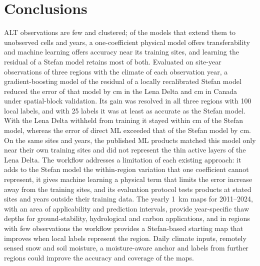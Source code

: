\section{Conclusions}\label{sec:conclusions}
ALT observations are few and clustered; of the models that extend them to unobserved cells and years, a one-coefficient physical model offers transferability and machine learning offers accuracy near its training sites, and learning the residual of a Stefan model retains most of both. Evaluated on \nncyAll{} site-year observations of three regions with the climate of each observation year, a gradient-boosting model of the residual of a locally recalibrated Stefan model reduced the error of that model by \ndrefLeblkRoabs{} cm in the Lena Delta and \ndrefCablkRoabs{} cm in Canada under spatial-block validation. Its gain was resolved in all three regions with 100 local labels, and with 25 labels it was at least as accurate as the Stefan model. With the Lena Delta withheld from training it stayed within \ndrefLeregRoabs{} cm of the Stefan model, whereas the error of direct ML exceeded that of the Stefan model by \ndrefLeregDzabs{} cm. On the same sites and years, the published ML products matched this model only near their own training sites and did not represent the thin active layers of the Lena Delta. The workflow addresses a limitation of each existing approach: it adds to the Stefan model the within-region variation that one coefficient cannot represent, it gives machine learning a physical term that limits the error increase away from the training sites, and its evaluation protocol tests products at stated sites and years outside their training data. The yearly 1~km maps for 2011--2024, with an area of applicability and prediction intervals, provide year-specific thaw depths for ground-stability, hydrological and carbon applications, and in regions with few observations the workflow provides a Stefan-based starting map that improves when local labels represent the region. Daily climate inputs, remotely sensed snow and soil moisture, a moisture-aware anchor and labels from further regions could improve the accuracy and coverage of the maps.
